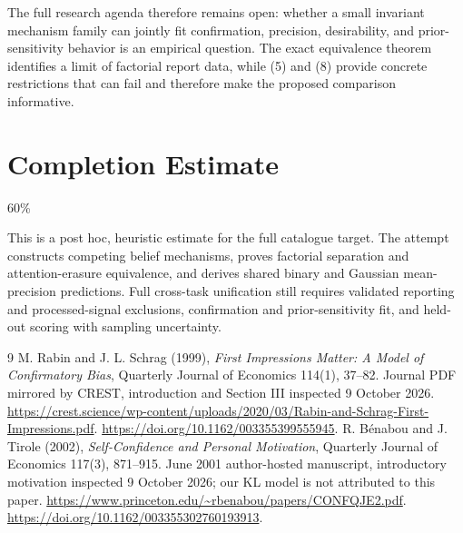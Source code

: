 \documentclass[11pt]{article}
\theoremstyle{remark}
\begin{document}
The full research agenda therefore remains open: whether a small invariant mechanism family can jointly fit confirmation, precision, desirability, and prior-sensitivity behavior is an empirical question. The exact equivalence theorem identifies a limit of factorial report data, while (5) and (8) provide concrete restrictions that can fail and therefore make the proposed comparison informative.

\section{Completion Estimate}
60\%

This is a post hoc, heuristic estimate for the full catalogue target.
The attempt constructs competing belief mechanisms, proves factorial separation and attention-erasure equivalence, and derives shared binary and Gaussian mean-precision predictions. Full cross-task unification still requires validated reporting and processed-signal exclusions, confirmation and prior-sensitivity fit, and held-out scoring with sampling uncertainty.

\begin{thebibliography}{9}
 M. Rabin and J. L. Schrag (1999), \emph{First Impressions Matter: A Model of Confirmatory Bias}, Quarterly Journal of Economics 114(1), 37--82. Journal PDF mirrored by CREST, introduction and Section III inspected 9 October 2026. \url{https://crest.science/wp-content/uploads/2020/03/Rabin-and-Schrag-First-Impressions.pdf}. \url{https://doi.org/10.1162/003355399555945}.
 R. B\'enabou and J. Tirole (2002), \emph{Self-Confidence and Personal Motivation}, Quarterly Journal of Economics 117(3), 871--915. June 2001 author-hosted manuscript, introductory motivation inspected 9 October 2026; our KL model is not attributed to this paper. \url{https://www.princeton.edu/~rbenabou/papers/CONFQJE2.pdf}. \url{https://doi.org/10.1162/003355302760193913}.
\end{thebibliography}
\end{document}
